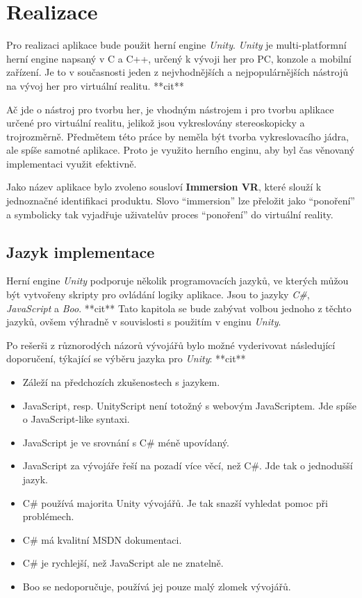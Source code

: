 \chapter{Realizace}\label{realizace}

Pro realizaci aplikace bude použit herní engine \emph{Unity}.
\emph{Unity} je multi-platformní herní engine napsaný v C a C++, určený
k vývoji her pro PC, konzole a mobilní zařízení. Je to v současnosti
jeden z nejvhodnějších a nejpopulárnějších nástrojů na vývoj her pro
virtuální realitu. **cit**

Ač jde o nástroj pro tvorbu her, je vhodným nástrojem i pro tvorbu
aplikace určené pro virtuální realitu, jelikož jsou vykreslovány 
stereoskopicky a trojrozměrně. Předmětem této práce by neměla 
být tvorba vykreslovacího jádra, ale spíše samotné aplikace. 
Proto je využito herního enginu, aby byl čas
věnovaný implementaci využit efektivně.

Jako název aplikace bylo zvoleno sousloví \textbf{Immersion VR}, které
slouží k jednoznačné identifikaci produktu. Slovo ``immersion'' lze
přeložit jako ``ponoření'' a symbolicky tak vyjadřuje uživatelův proces
``ponoření'' do virtuální reality.

\section{Jazyk implementace}\label{jazyk-implementace}

Herní engine \emph{Unity} podporuje několik programovacích jazyků, ve
kterých můžou být vytvořeny skripty pro ovládání logiky aplikace. Jsou
to jazyky \emph{C\#}, \emph{JavaScript} a \emph{Boo}. **cit** Tato kapitola se
bude zabývat volbou jednoho z těchto jazyků, ovšem výhradně v
souvislosti s použitím v enginu \emph{Unity}.

Po rešerši z různorodých názorů vývojářů bylo možné vyderivovat
následující doporučení, týkající se výběru jazyka pro \emph{Unity}: **cit**

\begin{itemize}
\tightlist
\item
  Záleží na předchozích zkušenostech s jazykem.
\item
  JavaScript, resp. UnityScript není totožný s webovým JavaScriptem. Jde
  spíše o JavaScript-like syntaxi.
\item
  JavaScript je ve srovnání s C\# méně upovídaný.
\item
  JavaScript za vývojáře řeší na pozadí více věcí, než C\#. Jde tak o
  jednodušší jazyk.
\item
  C\# používá majorita Unity vývojářů. Je tak snazší vyhledat pomoc při
  problémech.
\item
  C\# má kvalitní MSDN dokumentaci.
\item
  C\# je rychlejší, než JavaScript ale ne znatelně.
\item
  Boo se nedoporučuje, používá jej pouze malý zlomek vývojářů.
\end{itemize}

